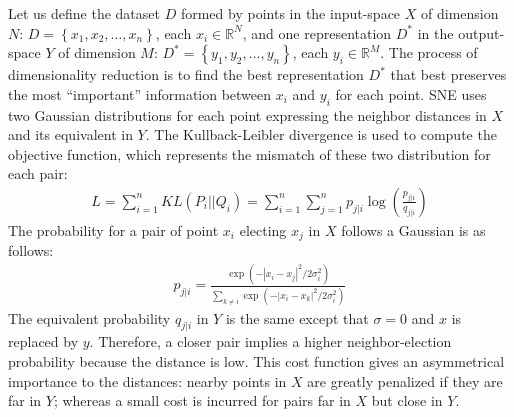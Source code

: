 \documentclass[a4paper,12pt]{report}
\newcommand{\R}{\mathbb{R}}
\begin{document}
Let us define the dataset $D$ formed by points in the input-space $X$ of dimension $N$: $D = \left\{ x_1, x_2, \dots, x_n \right\}$, each $x_i \in \R^N$, and one representation $D^\ast$ in the output-space $Y$ of dimension $M$: $D^\ast = \left\{ y_1, y_2, \dots, y_n \right\}$, each $y_i \in \R^M$.
The process of dimensionality reduction is to find the best representation $D^\ast$ that best preserves the most ``important'' information between $x_i$ and $y_i$ for each point.
SNE uses two Gaussian distributions for each point expressing the neighbor distances in $X$ and its equivalent in $Y$.
The Kullback-Leibler divergence is used to compute the objective function, which represents the mismatch of these two distribution for each pair:
\begin{eqnarray}
    L = \sum_{i=1}^n KL(P_i || Q_i) = \sum_{i=1}^n \sum_{j=1}^n p_{j|i} \log\left(\frac{p_{j|i}}{q_{j|i}}\right)
\end{eqnarray}
The probability for a pair of point $x_i$ electing $x_j$ in $X$ follows a Gaussian is as follows:
\begin{eqnarray}
    p_{j|i} = \frac{\exp(-|x_i - x_j|^2 / 2 \sigma_i^2)}{\sum_{k \not = i} \exp(-|x_i - x_k|^2 / 2 \sigma_i^2 )}
\end{eqnarray}
The equivalent probability $q_{j|i}$ in $Y$ is the same except that $\sigma = 0$ and $x$ is replaced by $y$.
Therefore, a closer pair implies a higher neighbor-election probability because the distance is low.
This cost function gives an asymmetrical importance to the distances: nearby points in $X$ are greatly penalized if they are far in $Y$; whereas a small cost is incurred for pairs far in $X$ but close in $Y$.
\end{document}
